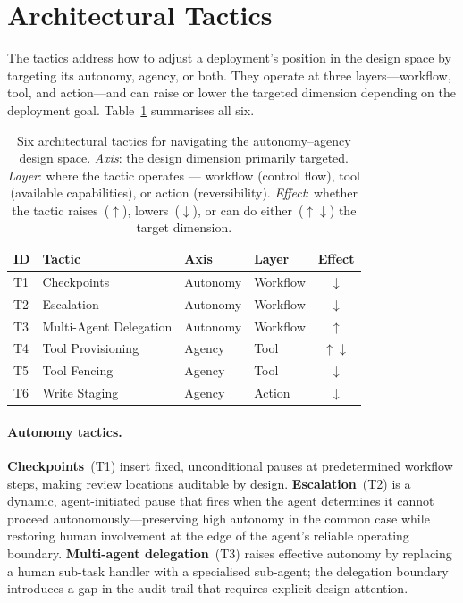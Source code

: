 \section{Architectural Tactics}

The tactics address how to adjust a deployment's position in the design space by targeting its autonomy, agency, or both. They operate at three layers---workflow, tool, and action---and can raise or lower the targeted dimension depending on the deployment goal. Table~\ref{tab:tactics} summarises all six.

\begin{table}[t]
    \centering
    \caption{Six architectural tactics for navigating the autonomy--agency design space. \emph{Axis}: the design dimension primarily targeted. \emph{Layer}: where the tactic operates --- workflow (control flow), tool (available capabilities), or action (reversibility). \emph{Effect}: whether the tactic raises~($\uparrow$), lowers~($\downarrow$), or can do either~($\uparrow\downarrow$) the target dimension.}\label{tab:tactics}
    \footnotesize
    \setlength{\tabcolsep}{5pt}
    \begin{tabular}{llllc}
        \toprule
        \textbf{ID} & \textbf{Tactic} & \textbf{Axis} & \textbf{Layer} & \textbf{Effect} \\
        \midrule
        T1 & Checkpoints            & Autonomy & Workflow & $\downarrow$ \\[2pt]
        T2 & Escalation             & Autonomy & Workflow & $\downarrow$ \\[2pt]
        T3 & Multi-Agent Delegation & Autonomy & Workflow & $\uparrow$   \\
        \midrule
        T4 & Tool Provisioning      & Agency   & Tool     & $\uparrow\downarrow$ \\[2pt]
        T5 & Tool Fencing           & Agency   & Tool     & $\downarrow$ \\[2pt]
        T6 & Write Staging          & Agency   & Action   & $\downarrow$ \\
        \bottomrule
    \end{tabular}
\end{table}

\paragraph{Autonomy tactics.}
\textbf{Checkpoints}~(T1) insert fixed, unconditional pauses at predetermined workflow steps, making review locations auditable by design. \textbf{Escalation}~(T2) is a dynamic, agent-initiated pause that fires when the agent determines it cannot proceed autonomously---preserving high autonomy in the common case while restoring human involvement at the edge of the agent's reliable operating boundary. \textbf{Multi-agent delegation}~(T3) raises effective autonomy by replacing a human sub-task handler with a specialised sub-agent; the delegation boundary introduces a gap in the audit trail that requires explicit design attention.

